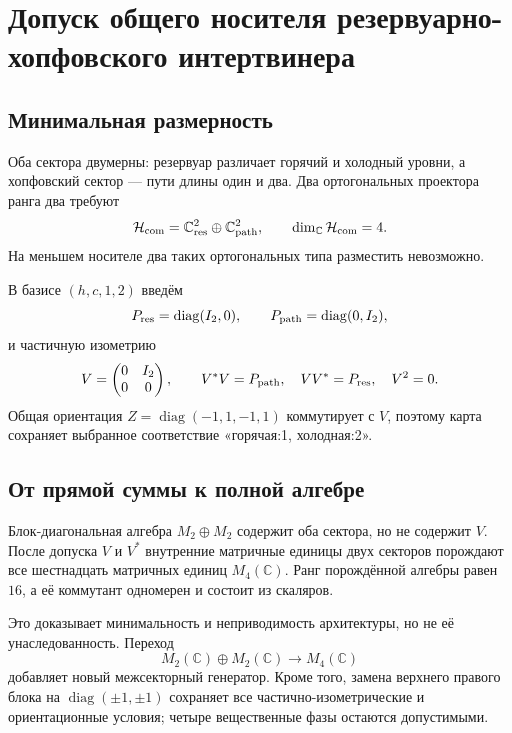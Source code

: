 \chapter{Допуск общего носителя резервуарно-хопфовского интертвинера}
\label{ch:v10-hopf-reservoir-common-carrier}

\section{Минимальная размерность}

Оба сектора двумерны: резервуар различает горячий и холодный уровни, а
хопфовский сектор --- пути длины один и два. Два ортогональных проектора
ранга два требуют
\begin{equation}
 \mathcal H_{\rm com}=\mathbb C^2_{\rm res}\oplus\mathbb C^2_{\rm path},
 \qquad \dim_{\mathbb C}\mathcal H_{\rm com}=4.
\end{equation}
На меньшем носителе два таких ортогональных типа разместить невозможно.

В базисе $(h,c,1,2)$ введём
\begin{equation}
 P_{\rm res}=\operatorname{diag}(I_2,0),\qquad
 P_{\rm path}=\operatorname{diag}(0,I_2),
\end{equation}
и частичную изометрию
\begin{equation}
 V=\begin{pmatrix}0&I_2\\0&0\end{pmatrix},\qquad
 V^*V=P_{\rm path},\quad VV^*=P_{\rm res},\quad V^2=0.
\end{equation}
Общая ориентация $Z=\operatorname{diag}(-1,1,-1,1)$ коммутирует с $V$,
поэтому карта сохраняет выбранное соответствие «горячая:1, холодная:2».

\section{От прямой суммы к полной алгебре}

Блок-диагональная алгебра $M_2\oplus M_2$ содержит оба сектора, но не
содержит $V$. После допуска $V$ и $V^*$ внутренние матричные единицы двух
секторов порождают все шестнадцать матричных единиц $M_4(\mathbb C)$.
Ранг порождённой алгебры равен $16$, а её коммутант одномерен и состоит из
скаляров.

Это доказывает минимальность и неприводимость архитектуры, но не её
унаследованность. Переход
\begin{equation}
 M_2(\mathbb C)\oplus M_2(\mathbb C)\longrightarrow M_4(\mathbb C)
\end{equation}
добавляет новый межсекторный генератор. Кроме того, замена верхнего правого
блока на $\operatorname{diag}(\pm1,\pm1)$ сохраняет все частично-изометрические
и ориентационные условия; четыре вещественные фазы остаются допустимыми.

